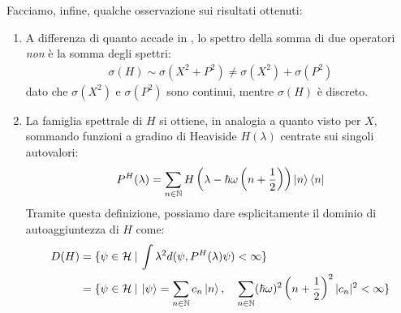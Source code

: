 \documentclass[../../FisicaTeorica.tex]{subfiles}
\begin{document}
Facciamo, infine, qualche osservazione sui risultati ottenuti:
\begin{enumerate}
\item A differenza di quanto accade in \MC, lo spettro della somma di due operatori \textit{non} è la somma degli spettri: 
\begin{align*}
\sigma(H)\sim\sigma(X^2+ P^2) \neq \sigma(X^2) + \sigma(P^2)
\end{align*}
dato che $\sigma(X^2)$ e $\sigma(P^2)$ sono continui, mentre $\sigma(H)$ è discreto.
\item La famiglia spettrale di $H$ si ottiene, in analogia a quanto visto per $X$, sommando funzioni a gradino di Heaviside $H(\lambda)$ centrate sui singoli autovalori:
\[
P^H(\lambda) = \sum_{n\in \mathbb{N}}H\left(\lambda-\hbar\omega\left(n+\frac{1}{2}\right) \right)\Ket{n}\Bra{n}
\] 
Tramite questa definizione, possiamo dare esplicitamente il dominio di autoaggiuntezza di $H$ come:
\begin{align*}
D(H) &= \{\psi \in \mathcal{H} \>|\> \int \lambda^2 d(\psi, P^H(\lambda)\psi) < \infty\} \\
&=\{\psi \in \mathcal{H} \>|\> \Ket{\psi}=\sum_{n\in \mathbb{N}}c_n\Ket{n}, \quad \sum_{n\in \mathbb{N}} (\hbar \omega)^2 \left(n+\frac{1}{2}\right)^2 |c_n|^2 < \infty\}
\end{align*}


\end{enumerate}
\end{document}

